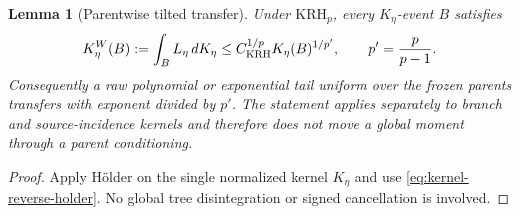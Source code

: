 \documentclass[11pt]{article}
\newtheorem{lemma}[theorem]{Lemma}
\begin{document}
\begin{lemma}[Parentwise tilted transfer]
\label{lem:parentwise-holder-transfer}
Under $\mathrm{KRH}_{p}$, every $K_\eta$-event $B$ satisfies
\begin{equation}
\label{eq:parentwise-holder-transfer}
 K_\eta^{W}(B):=\int_B L_\eta\,dK_\eta
 \le C_{\rm KRH}^{1/p}K_\eta(B)^{1/p'},
 \qquad p'=\frac p{p-1}.
\end{equation}
Consequently a raw polynomial or exponential tail uniform over the frozen
parents transfers with exponent divided by $p'$.  The statement applies
separately to branch and source-incidence kernels and therefore does not move
a global moment through a parent conditioning.
\end{lemma}

\begin{proof}
Apply H\"older on the single normalized kernel $K_\eta$ and use
\eqref{eq:kernel-reverse-holder}.  No global tree disintegration or signed
cancellation is involved.
\end{proof}
\end{document}
